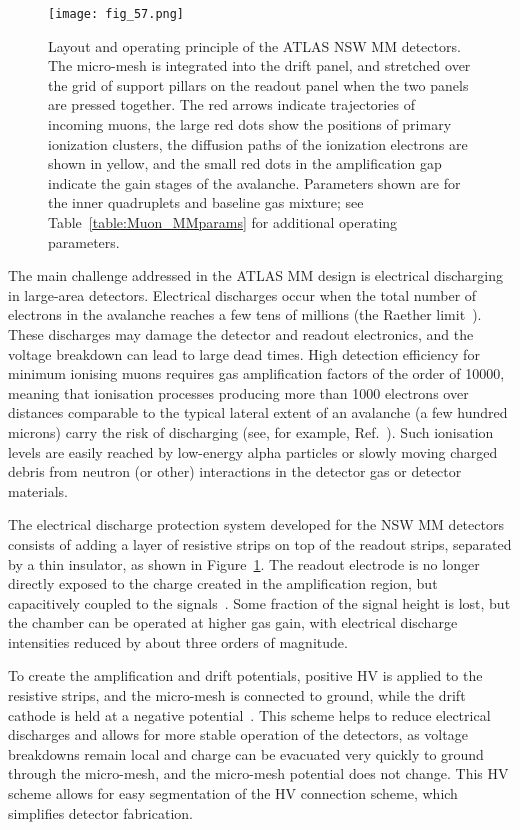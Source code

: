 \documentclass[cernpreprint, atlasdraft=false, UKenglish,british,orcidlogo, texmf, orcidlogo]{atlasdoc}
\begin{document}
\begin{figure}[!h] \centerline{\texttt{[image: fig\_57.png]}}
\caption{Layout and operating principle of the ATLAS \gls{NSW} \gls{MM} detectors. The micro-mesh is integrated into the drift panel, and stretched over the grid of support pillars on the readout panel when the two panels are pressed together. The red arrows indicate trajectories of incoming muons, the large red dots show the positions of primary ionization clusters, the diffusion paths of the ionization electrons are shown in yellow, and the small red dots in the amplification gap indicate the gain stages of the avalanche.
Parameters shown are for the inner quadruplets and baseline gas mixture; see Table~\ref{table:Muon_MMparams} for additional operating parameters.
\label{fig:Muon_MMprinciple}}
\end{figure}
 
The main challenge addressed in the ATLAS \gls{MM} design is electrical discharging~\cite{ALEXOPOULOS2019125} in large-area detectors. Electrical discharges occur
when the total number of electrons in the avalanche reaches a few tens of millions
(the Raether limit~\cite{ref26TDR}). These discharges may damage the  detector and readout electronics, and the voltage breakdown can lead to large dead times.
High detection efficiency for minimum ionising muons requires gas amplification factors of the order of \num{10000}, meaning that ionisation processes producing more than \num{1000} electrons over distances comparable to the typical lateral extent of an avalanche (a few hundred microns) carry the risk of discharging (see, for example, Ref.~\cite{ref27TDR}). Such ionisation levels are easily reached by low-energy alpha particles or slowly moving charged debris from neutron (or other) interactions in the detector gas or detector materials.
 
The electrical discharge protection system developed for the \gls{NSW} \gls{MM} detectors consists of adding a layer of resistive strips on top of the readout strips, separated by a thin insulator, as shown in Figure~\ref{fig:Muon_MMprinciple}. The readout electrode is no longer directly exposed to the charge created in the amplification region, but capacitively coupled to the signals~\cite{ATLAS-TDR-20}. Some fraction of the signal height is lost, but the chamber can be operated at higher gas gain, with electrical discharge intensities reduced by about three orders of magnitude.
 
To create the amplification and drift potentials, positive \gls{HV} is applied to the resistive strips, and the micro-mesh is connected to ground, while the drift cathode is held at a negative potential~\cite{ALEXOPOULOS2019125}.
This scheme helps to reduce electrical discharges and allows for more stable operation of the detectors, as voltage breakdowns remain local and charge can be evacuated very quickly to ground through the micro-mesh, and the micro-mesh potential does not change. This \gls{HV} scheme
allows for easy segmentation of the \gls{HV} connection scheme, which simplifies detector fabrication.
 
\end{document}

